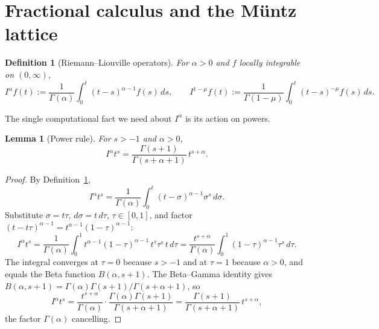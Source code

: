\documentclass[11pt]{article}
\newtheorem{lemma}[theorem]{Lemma}
\newtheorem{definition}[theorem]{Definition}
\newcommand{\Ico}{I^{1-\mu}}
\begin{document}
\section{Fractional calculus and the M\"untz lattice}\label{sec:fc}

\begin{definition}[Riemann--Liouville operators]\label{def:RL}
For $\alpha>0$ and $f$ locally integrable on $(0,\infty)$,
\begin{equation}\label{eq:RL-def}
I^{\alpha}f(t):=\frac{1}{\Gamma(\alpha)}\int_0^t(t-s)^{\alpha-1}f(s)\,ds,
\qquad
\Ico f(t):=\frac{1}{\Gamma(1-\mu)}\int_0^t(t-s)^{-\mu}f(s)\,ds .
\end{equation}
\end{definition}

The single computational fact we need about $I^{\alpha}$ is its action on
powers.

\begin{lemma}[Power rule]\label{lem:power}
For $s>-1$ and $\alpha>0$,
\begin{equation}\label{eq:power}
I^{\alpha}t^{s}=\frac{\Gamma(s+1)}{\Gamma(s+\alpha+1)}\,t^{s+\alpha}.
\end{equation}
\end{lemma}

\begin{proof}
By Definition~\ref{def:RL},
\begin{equation}\label{eq:power-1}
I^{\alpha}t^{s}=\frac{1}{\Gamma(\alpha)}\int_0^t(t-\sigma)^{\alpha-1}
\sigma^{s}\,d\sigma .
\end{equation}
Substitute $\sigma=t\tau$, $d\sigma=t\,d\tau$, $\tau\in[0,1]$, and factor
$(t-t\tau)^{\alpha-1}=t^{\alpha-1}(1-\tau)^{\alpha-1}$:
\begin{equation}\label{eq:power-2}
I^{\alpha}t^{s}
=\frac{1}{\Gamma(\alpha)}\int_0^1 t^{\alpha-1}(1-\tau)^{\alpha-1}\,
t^{s}\tau^{s}\,t\,d\tau
=\frac{t^{s+\alpha}}{\Gamma(\alpha)}\int_0^1(1-\tau)^{\alpha-1}\tau^{s}
\,d\tau .
\end{equation}
The integral converges at $\tau=0$ because $s>-1$ and at $\tau=1$ because
$\alpha>0$, and equals the Beta function $B(\alpha,s+1)$. The Beta--Gamma
identity gives $B(\alpha,s+1)=\Gamma(\alpha)\Gamma(s+1)/\Gamma(s+\alpha+1)$,
so
\begin{equation}\label{eq:power-3}
I^{\alpha}t^{s}=\frac{t^{s+\alpha}}{\Gamma(\alpha)}\cdot
\frac{\Gamma(\alpha)\Gamma(s+1)}{\Gamma(s+\alpha+1)}
=\frac{\Gamma(s+1)}{\Gamma(s+\alpha+1)}\,t^{s+\alpha},
\end{equation}
the factor $\Gamma(\alpha)$ cancelling.
\end{proof}
\end{document}
